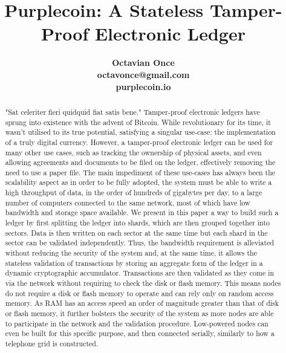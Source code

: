 \documentclass[notitlepage]{article}
\title{Purplecoin: A Stateless Tamper-Proof Electronic Ledger}
\author{\textbf{Octavian Once} \\ \textbf{octavonce@gmail.com} \\ \textbf{purplecoin.io}}
\date{}
\begin{document}
\newcommand{\slice}[4]{
  \pgfmathparse{0.5*#1+0.5*#2}
  \let\midangle\pgfmathresult

  \draw[thick,fill=black!10] (0,0) -- (#1:1) arc (#1:#2:1) -- cycle;

  \node[label=\midangle:#4] at (\midangle:1) {};

  \pgfmathparse{min((#2-#1-10)/110*(-0.3),0)}
  \let\temp\pgfmathresult
  \pgfmathparse{max(\temp,-0.5) + 0.8}
  \let\innerpos\pgfmathresult
  \node at (\midangle:\innerpos) {#3};
}

\maketitle
\thispagestyle{empty}

\begin{abstract}
"Sat celeriter fieri quidquid fiat satis bene." Tamper-proof electronic ledgers have sprung into existence with the advent of Bitcoin. While revolutionary for its time, it wasn't utilised to its true potential, satisfying a singular use-case: the implementation of a truly digital currency. However, a tamper-proof electronic ledger can be used for many other use cases, such as tracking the ownership of physical assets, and even allowing agreements and documents to be filed on the ledger, effectively removing the need to use a paper file. The main impediment of these use-cases has always been the scalability aspect as in order to be fully adopted, the system must be able to write a high throughput of data, in the order of hundreds of gigabytes per day, to a large number of computers connected to the same network, most of which have low bandwidth and storage space available. We present in this paper a way to build such a ledger by first splitting the ledger into shards, which are then grouped together into sectors. Data is then written on each sector at the same time but each shard in the sector can be validated independently. Thus, the bandwidth requirement is alleviated without reducing the security of the system and, at the same time, it allows the stateless validation of transactions by storing an aggregate form of the ledger in a dynamic cryptographic accumulator. Transactions are then validated as they come in via the network without requiring to check the disk or flash memory. This means nodes do not require a disk or flash memory to operate and can rely only on random access memory. As RAM has an access speed an order of magnitude greater than that of disk or flash memory, it further bolsters the security of the system as more nodes are able to participate in the network and the validation procedure. Low-powered nodes can even be built for this specific purpose, and then connected serially, similarly to how a telephone grid is constructed.
\end{abstract}
\end{document}

